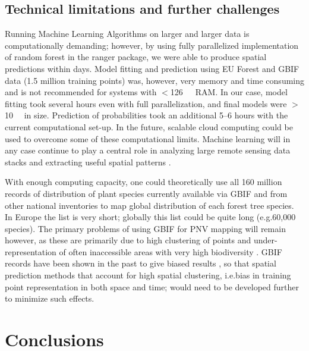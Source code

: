 \documentclass[fleqn,10pt,lineno]{wlpeerj} %
\begin{document}
\subsection*{Technical limitations and further challenges}

Running Machine Learning Algorithms on larger and larger data is computationally demanding; however, by using fully parallelized implementation of random forest in the \textsf{ranger} package, we were able to produce spatial predictions within days. Model fitting and prediction using EU Forest and GBIF data (1.5 million training points) was, however, very memory and time consuming and is not recommended for systems with $<$\SI{126}{\gibi\byte}~RAM. In our case, model fitting took several hours even with full parallelization, and  final models were $>$\SI{10}{\gibi\byte} in size. Prediction of probabilities took an additional 5--6 hours with the current computational set-up. In the future, scalable cloud computing could be used to overcome some of these computational limits. Machine learning will in any case continue to play a central role in analyzing large remote sensing data stacks and extracting useful spatial patterns \citep{LARY20163}.\par

With enough computing capacity, one could theoretically use all 160 million records of distribution of plant species currently available via GBIF \citep{Meyer2016EL} and from other national inventories to map global distribution of each forest tree species. In Europe the list is very short; globally this list could be quite long (e.g.\@ 60,000 species). The primary problems of using GBIF for PNV mapping will remain however, as these are primarily due to high clustering of points and under-representation of often inaccessible areas with very high biodiversity \citep{Yesson2007PLOS,Meyer2016EL}. GBIF records have been shown in the past to give biased results \citep{10.7717/peerj.2743}, so that spatial prediction methods that account for high spatial clustering, i.e.\@ bias in training point representation in both space and time; would need to be developed further to minimize such effects. \par

\section*{Conclusions}
\end{document}
